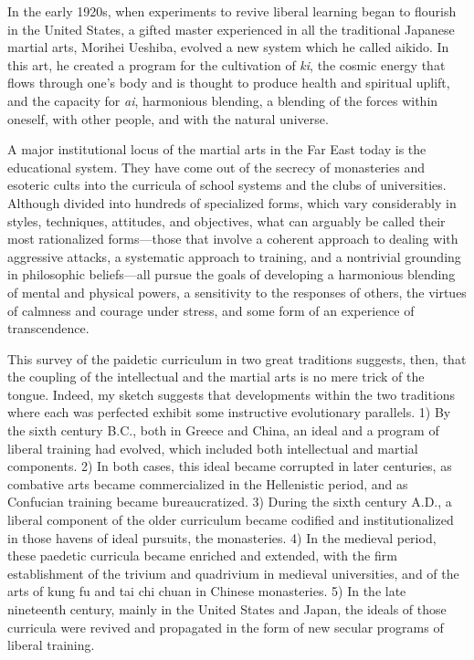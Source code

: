 In the early 1920s, when experiments to revive liberal learning began to flourish in the United States, a gifted master experienced in all the traditional Japanese martial arts, Morihei Ueshiba, evolved a new system which he called aikido. In this art, he created a program for the cultivation of \emph{ki}, the cosmic energy that flows through one's body and is thought to produce health and spiritual uplift, and the capacity for \emph{ai}, harmonious blending, a blending of the forces within oneself, with other people, and with the natural universe. 

A major institutional locus of the martial arts in the Far East today is the educational system. They have come out of the secrecy of monasteries and esoteric cults into the curricula of school systems and the clubs of universities. Although divided into hundreds of specialized forms, which vary considerably in styles, techniques, attitudes, and objectives, what can arguably be called their most rationalized forms---those that involve a coherent approach to dealing with aggressive attacks, a systematic approach to training, and a nontrivial grounding in philosophic beliefs---all pursue the goals of developing a harmonious blending of mental and physical powers, a sensitivity to the responses of others, the virtues of calmness and courage under stress, and some form of an experience of transcendence. 

This survey of the paidetic curriculum in two great traditions suggests, then, that the coupling of the intellectual and the martial arts is no mere trick of the tongue. Indeed, my sketch suggests that developments within the two traditions where each was perfected exhibit some instructive evolutionary parallels. 1) By the sixth century B.C., both in Greece and China, an ideal and a program of liberal training had evolved, which included both intellectual and martial components. 2) In both cases, this ideal became corrupted in later centuries, as combative arts became commercialized in the Hellenistic period, and as Confucian training became bureaucratized. 3) During the sixth century A.D., a liberal component of the older curriculum became codified and institutionalized in those havens of ideal pursuits, the monasteries. 4) In the medieval period, these paedetic curricula became enriched and extended, with the firm establishment of the trivium and quadrivium in medieval universities, and of the arts of kung fu and tai chi chuan in Chinese monasteries. 5) In the late nineteenth century, mainly in the United States and Japan, the ideals of those curricula were revived and propagated in the form of new secular programs of liberal training. 


